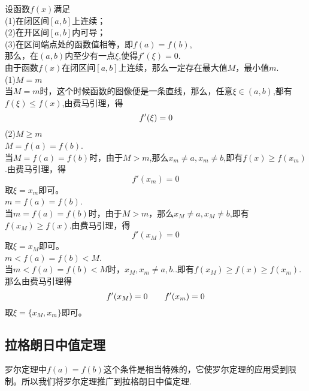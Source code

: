 \sj
\theorem[罗尔(Rolle)定理]
\noindent 设函数$f(x)$满足\\
\kg(1)\enspace 在闭区间$[a,b]$上连续；\\
\kg(2)\enspace 在开区间$[a,b]$内可导；\\
\kg(3)\enspace 在区间端点处的函数值相等，即$f(a)=f(b)$,\\
那么，在$(a,b)$内至少有一点$\xi $,使得$f'(\xi)=0$.\vspace{0.5em}\\
\proof 由于函数$f(x)$在闭区间$[a,b]$上连续，那么一定存在最大值$M$，最小值$m$.
\\ (1)\enspace $M=m$\\
\kg 当$M=m$时，这个时候函数的图像便是一条直线，那么，任意$\xi \in(a,b)$,都有$f(\xi)\leq f(x)$,由费马引理，得
\begin{equation}
\nonumber
f'(\xi)=0\sj
\end{equation}
(2)\enspace$M\geq m $\\
\quad {} $M=f(a)=f(b)$.\\
\kg 当$M=f(a)=f(b)$时，由于$M>m$,那么$x_m\neq a,x_m\neq b$,即有$f(x)\geq f(x_m)$.由费马引理，得
\begin{equation}
	\nonumber
	f'(x_m)=0
\end{equation}
取$\xi=x_m$即可。\\
\quad {} $m=f(a)=f(b)$.\\
\kg 当$m=f(a)=f(b)$时，由于$M>m$，那么$x_M\neq a,x_M\neq b$,即有$f(x_M)\geq f(x)$.由费马引理，得
\begin{equation}
	f'(x_M)=0
\end{equation}
取$\xi=x_M$即可。\\
\quad {} $m<f(a)=f(b)<M$.\\
\kg 当$m<f(a)=f(b)<M时$，$x_M,x_m\neq a,b.$.即有$f(x_M)\geq f(x)\geq f(x_m)$.那么由费马引理得
\begin{equation}
	f'(x_M)=0\hspace*{2em} f'(x_m)=0
\end{equation}
取$\xi=\big\lbrace x_M,x_m \big\rbrace$即可。
\subsection{拉格朗日中值定理}
罗尔定理中$f(a)=f(b)$这个条件是相当特殊的，它使罗尔定理的应用受到限制。所以我们将罗尔定理推广到拉格朗日中值定理.\\

\sj
{}

